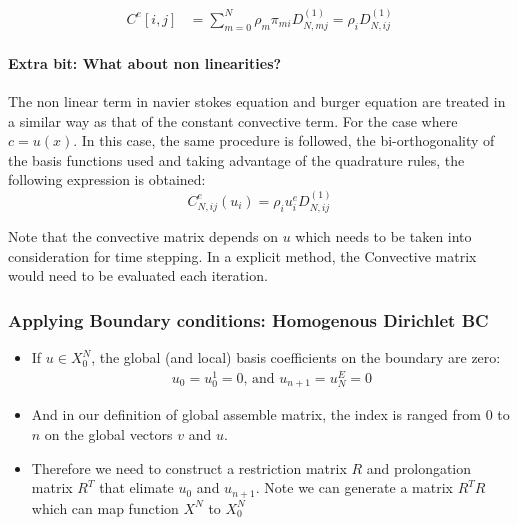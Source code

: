 \documentclass[
]{scrartcl}
\begin{document}
\begin{align}
C^{e}[i,j]&=\sum_{m=0}^{N} \rho_m \pi_{mi}D^{(1)}_{N,mj}= \rho_iD^{(1)}_{N,ij} 
\end{align}

\hypertarget{extra-bit-what-about-non-linearities}{%
\paragraph{Extra bit: What about non
linearities?}\label{extra-bit-what-about-non-linearities}}

The non linear term in navier stokes equation and burger equation are
treated in a similar way as that of the constant convective term. For
the case where \(c=u(x)\). In this case, the same procedure is followed,
the bi-orthogonality of the basis functions used and taking advantage of
the quadrature rules, the following expression is obtained:
\begin{equation}
C^{e}_{N,ij}(u_i) =  \rho_i u_i^{e} D^{(1)}_{N,ij}
\end{equation}

Note that the convective matrix depends on \(u\) which needs to be taken
into consideration for time stepping. In a explicit method, the
Convective matrix would need to be evaluated each iteration.

\hypertarget{applying-boundary-conditions-homogenous-dirichlet-bc}{%
\subsubsection{Applying Boundary conditions: Homogenous Dirichlet
BC}\label{applying-boundary-conditions-homogenous-dirichlet-bc}}

\begin{itemize}
\item
  If \(u\in X_0^{N}\), the global (and local) basis coefficients on the
  boundary are zero: \begin{align}
  u_0 = u_0^1 = 0 \text{, and }u_{n+1} = u_N^E = 0
  \end{align}
\item
  And in our definition of global assemble matrix, the index is ranged
  from 0 to \(n\) on the global vectors \(v\) and \(u\).
\item
  Therefore we need to construct a restriction matrix \(R\) and
  prolongation matrix \(R^T\) that elimate \(u_0\) and \(u_{n+1}\). Note
  we can generate a matrix \(R^TR\) which can map function \(X^N\) to
  \(X^N_0\)
\end{itemize}
\end{document}
